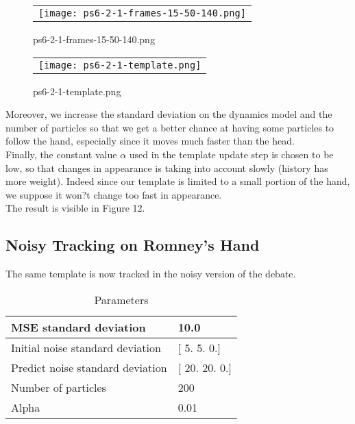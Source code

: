 \documentclass[a4paper,11pt]{article}
\begin{document}
\begin{figure}[H]
\begin{center}
\begin{tabular}{c}
	\texttt{[image: ps6-2-1-frames-15-50-140.png]}\\
\end{tabular}
\end{center}
\caption{ps6-2-1-frames-15-50-140.png}
\label{ps-6-6-a}
\end{figure}

\begin{figure}[H]
\begin{center}
\begin{tabular}{c}
	\texttt{[image: ps6-2-1-template.png]}\\
\end{tabular}
\end{center}
\caption{ps6-2-1-template.png}
\label{ps-6-5-b}
\end{figure}

Moreover, we increase the standard deviation on the dynamics model and the number of particles so that we get a better chance at having some particles to follow the hand, especially since it moves much faster than the head.\\
Finally, the constant value $\alpha$ used in the template update step is chosen to be low, so that changes in appearance is taking into account slowly (history has more weight). Indeed since our template is limited to a small portion of the hand, we suppose it won?t change too fast in appearance.\\
The result is visible in Figure 12.

\lstset{style=mystyle}


\subsection{Noisy Tracking on Romney's Hand}

The same template is now tracked in the noisy version of the debate.

\begin{table}[H]
\centering
\caption{Parameters}
\begin{tabular}{|l|l|}
\hline
    MSE standard deviation   &   10.0 \\ \hline
    Initial noise standard deviation &  [ 5.  5.  0.] \\ \hline
    Predict noise standard deviation &  [ 20.  20.  0.] \\ \hline
    Number of particles &  200 \\ \hline
    Alpha   & 0.01\\ \hline
\end{tabular}
\end{table}
\end{document}
